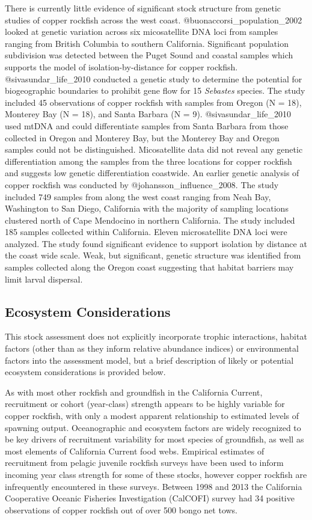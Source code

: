 \documentclass[11pt,
  letterpaper,
]{article}
\begin{document}
There is currently little evidence of significant stock structure from genetic studies of copper rockfish across the west coast. @buonaccorsi\_population\_2002 looked at genetic variation across six micosatellite DNA loci from samples ranging from British Columbia to southern California. Significant population subdivision was detected between the Puget Sound and coastal samples which supports the model of isolation-by-distance for copper rockfish. @sivasundar\_life\_2010 conducted a genetic study to determine the potential for biogeographic boundaries to prohibit gene flow for 15 \emph{Sebastes} species. The study included 45 observations of copper rockfish with samples from Oregon (N = 18), Monterey Bay (N = 18), and Santa Barbara (N = 9). @sivasundar\_life\_2010 used mtDNA and could differentiate samples from Santa Barbara from those collected in Oregon and Monterey Bay, but the Monterey Bay and Oregon samples could not be distinguished. Micosatellite data did not reveal any genetic differentiation among the samples from the three locations for copper rockfish and suggests low genetic differentiation coastwide. An earlier genetic analysis of copper rockfish was conducted by @johansson\_influence\_2008. The study included 749 samples from along the west coast ranging from Neah Bay, Washington to San Diego, California with the majority of sampling locations clustered north of Cape Mendocino in northern California. The study included 185 samples collected within California. Eleven microsatellite DNA loci were analyzed. The study found significant evidence to support isolation by distance at the coast wide scale. Weak, but significant, genetic structure was identified from samples collected along the Oregon coast suggesting that habitat barriers may limit larval dispersal.

\subsection{Ecosystem Considerations}\label{ecosystem-considerations}

This stock assessment does not explicitly incorporate trophic interactions, habitat factors (other than as they inform relative abundance indices) or environmental factors into the assessment model, but a brief description of likely or potential ecosystem considerations is provided below.

As with most other rockfish and groundfish in the California Current, recruitment or cohort (year-class) strength appears to be highly variable for copper rockfish, with only a modest apparent relationship to estimated levels of spawning output. Oceanographic and ecosystem factors are widely recognized to be key drivers of recruitment variability for most species of groundfish, as well as most elements of California Current food webs. Empirical estimates of recruitment from pelagic juvenile rockfish surveys have been used to inform incoming year class strength for some of these stocks, however copper rockfish are infrequently encountered in these surveys. Between 1998 and 2013 the California Cooperative Oceanic Fisheries Investigation (CalCOFI) survey had 34 positive observations of copper rockfish out of over 500 bongo net tows.
\end{document}
